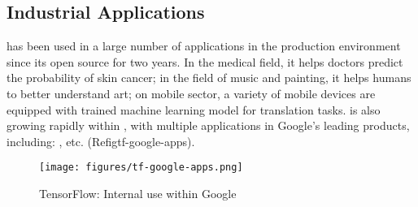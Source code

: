 \begin{content}
\subsection{Industrial Applications}
 has been used in a large number of applications in the production environment since its open source for two years. In the medical field, it helps doctors predict the probability of skin cancer; in the field of music and painting, it helps humans to better understand art; on mobile sector, a variety of mobile devices are equipped with  trained machine learning model for translation tasks.  is also growing rapidly within , with multiple applications in Google's leading products, including: , etc. (Refig{tf-google-apps}).
\begin{figure}[!htbp]
  \centering
  \texttt{[image: figures/tf-google-apps.png]}
  \caption{TensorFlow: Internal use within Google}
  \label{fig:tf-google-apps}
\end{figure}

\end{content}
